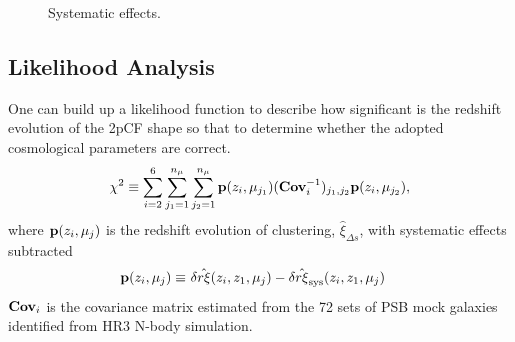 \documentclass[iop]{emulateapj}
\begin{document}



\begin{figure}
   \caption{\label{fig_sys}
  Systematic effects.
   }
\end{figure}


\subsection{Likelihood Analysis}

One can build up a likelihood function to 
describe how significant is the redshift evolution of the 2pCF shape
so that to determine whether the adopted cosmological parameters are correct.
\begin{equation}\label{eq:chisq1}
\chi^2\equiv \sum_{i=2}^{6} \sum_{j_1=1}^{n_{\mu}} \sum_{j_2=1}^{n_{\mu}} {\bf p}(z_i,\mu_{j_1}) ({\bf Cov}_{i}^{-1})_{j_1,j_2}  {\bf p}(z_i,\mu_{j_2}),
\end{equation}
where ${\bf p}(z_i,\mu_{j})$ is the redshift evolution of clustering, 
$\hat \xi_{\Delta s}$, with systematic effects subtracted
\begin{eqnarray}\label{eq:bfp}
 {\bf p}(z_i,\mu_{j}) \equiv&\ \delta \hat{r\xi}(z_i,z_1,\mu_j) - \delta \hat{r\xi}_{\rm sys}(z_i,z_1,\mu_j)
\end{eqnarray}
${\bf Cov}_i$ is the covariance matrix estimated from the 72 sets of PSB mock galaxies identified from HR3 N-body simulation.
\end{document}
